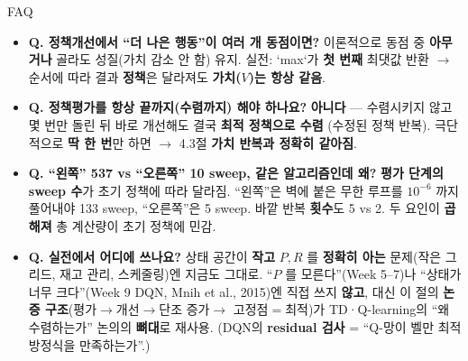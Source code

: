 \begin{frame}{FAQ}
  \begin{itemize}
    \item \textbf{Q. 정책개선에서 ``더 나은 행동''이 여러 개
      동점이면?} 이론적으로 동점 중 \textbf{아무거나} 골라도
      성질(가치 감소 안 함) 유지. 실전: `max`가 \textbf{첫
      번째} 최댓값 반환 $\to$ 순서에 따라 결과 \textbf{정책}은
      달라져도 \textbf{가치($V$)는 항상 같음}.
    \item \textbf{Q. 정책평가를 항상 끝까지(수렴까지) 해야
      하나요?} \textbf{아니다} --- 수렴시키지 않고 몇 번만
      돌린 뒤 바로 개선해도 결국 \textbf{최적 정책으로 수렴}
      (수정된 정책 반복). 극단적으로 \textbf{딱 한 번}만 하면
      $\to$ 4.3절 \textbf{가치 반복과 정확히 같아짐}.
    \item \textbf{Q. ``왼쪽'' 537 vs ``오른쪽'' 10 sweep,
      같은 알고리즘인데 왜?} \textbf{평가 단계의 sweep 수}가
      초기 정책에 따라 달라짐. ``왼쪽''은 벽에 붙은 무한 루프를
      $10^{-6}$ 까지 풀어내야 133 sweep, ``오른쪽''은 5 sweep.
      바깥 반복 \textbf{횟수}도 5 vs 2. 두 요인이 \textbf{곱해져}
      총 계산량이 초기 정책에 민감.
    \item \textbf{Q. 실전에서 어디에 쓰나요?} 상태 공간이
      \textbf{작고} $P, R$ 를 \textbf{정확히 아는} 문제(작은
      그리드, 재고 관리, 스케줄링)엔 지금도 그대로. ``$P$ 를
      모른다''(Week 5--7)나 ``상태가 너무 크다''(Week 9 DQN,
      Mnih et al., 2015)엔 직접 쓰지 \textbf{않고}, 대신 이 절의
      \textbf{논증 구조}(평가$\to$개선$\to$단조 증가$\to$
      고정점$=$최적)가 TD·Q-learning의 ``왜 수렴하는가''
      논의의 \textbf{뼈대}로 재사용. (DQN의 \textbf{residual
      검사} = ``Q-망이 벨만 최적방정식을 만족하는가''.)
  \end{itemize}
\end{frame}
